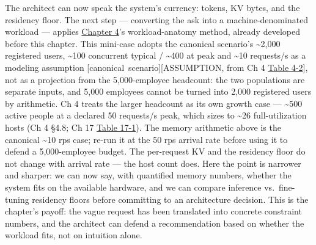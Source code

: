 The architect can now speak the system's currency: tokens, KV bytes, and
the residency floor. The next step --- converting the ask into a
machine-denominated workload --- applies \hyperref[chap:4]{Chapter 4}'s workload-anatomy
method, already developed before this chapter. This mini-case adopts the
canonical scenario's \textasciitilde2,000 registered users,
\textasciitilde100 concurrent typical / \textasciitilde400 at peak and
\textasciitilde10 requests/s as a modeling assumption \mbox{{[}canonical
scenario{]}}{[}ASSUMPTION, from Ch 4 \hyperref[tab:4.2]{Table 4-2}{]}, not as a projection
from the 5,000-employee headcount: the two populations are separate
inputs, and 5,000 employees cannot be turned into 2,000 registered users
by arithmetic. Ch 4 treats the larger headcount as its own growth case
--- \textasciitilde500 active people at a declared 50 requests/s peak,
which sizes to \textasciitilde26 full-utilization hosts (Ch 4 §4.8; Ch
17 \hyperref[tab:17.1]{Table 17-1}). The memory arithmetic above is the canonical
\textasciitilde10 rps case; re-run it at the 50 rps arrival rate before
using it to defend a 5,000-employee budget. The per-request KV and the
residency floor do not change with arrival rate --- the host count does.
Here the point is narrower and sharper: we can now say, with quantified
memory numbers, whether the system fits on the available hardware, and
we can compare inference vs.~fine-tuning residency floors before
committing to an architecture decision. This is the chapter's payoff:
the vague request has been translated into concrete constraint numbers,
and the architect can defend a recommendation based on whether the
workload fits, not on intuition alone.
